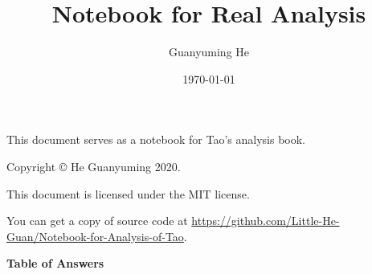 \documentclass[11pt]{article}
\author{Guanyuming He}
\title{Notebook for Real Analysis}
\date{\today}
\begin{document}
\maketitle

\begin{center}
This document serves as a notebook for Tao's analysis book.
\end{center}

\vspace{\fill}

\begin{center}
Copyright \copyright{} He Guanyuming 2020. 

This document is licensed under the MIT license.

You can get a copy of source code at 
\url{https://github.com/Little-He-Guan/Notebook-for-Analysis-of-Tao}.
\end{center}

\newpage
{}
\tableofcontents

\newpage


\newpage
{}
\pagestyle{headings}



\newpage


\newpage


\newpage
\begin{center}
\begin{Large}
\textbf{Table of Answers}
\end{Large}
\end{center}
\end{document}
